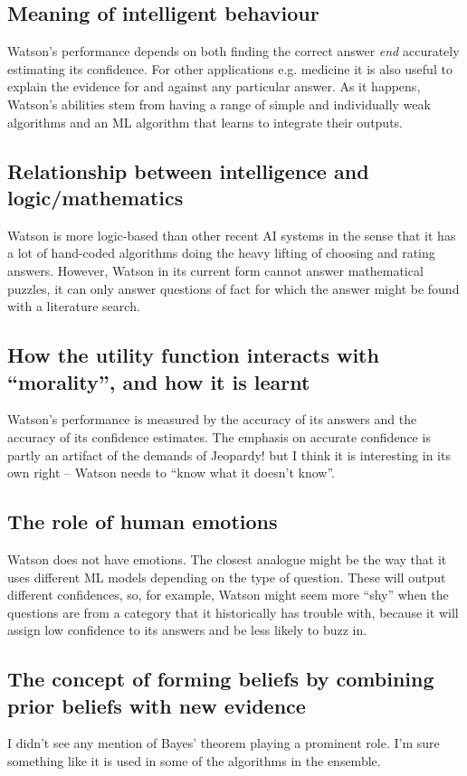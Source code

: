 \documentclass[10pt,a4paper]{article}
\newcommand{\nquote}[1]{``{#1}''}
\begin{document}
\subsection{Meaning of intelligent behaviour}
Watson's performance depends on both finding the correct answer \emph{end} accurately estimating its confidence. For other applications e.g. medicine \cite{watsonmedicine} it is also useful to explain the evidence for and against any particular answer. As it happens, Watson's abilities stem from having a range of simple and individually weak algorithms and an ML algorithm that learns to integrate their outputs.

\subsection{Relationship between intelligence and logic/mathematics}
Watson is more logic-based than other recent AI systems in the sense that it has a lot of hand-coded algorithms doing the heavy lifting of choosing and rating answers. However, Watson in its current form cannot answer mathematical puzzles, it can only answer questions of fact for which the answer might be found with a literature search.

\subsection{How the utility function interacts with \nquote{morality}, and how it is learnt}
Watson's performance is measured by the accuracy of its answers and the accuracy of its confidence estimates. The emphasis on accurate confidence is partly an artifact of the demands of Jeopardy! but I think it is interesting in its own right -- Watson needs to \nquote{know what it doesn't know}.

\subsection{The role of human emotions}
Watson does not have emotions. The closest analogue might be the way that it uses different ML models depending on the type of question. These will output different confidences, so, for example, Watson might seem more \nquote{shy} when the questions are from a category that it historically has trouble with, because it will assign low confidence to its answers and be less likely to buzz in.

\subsection{The concept of forming beliefs by combining prior beliefs with new evidence}
I didn't see any mention of Bayes' theorem playing a prominent role. I'm sure something like it is used in some of the algorithms in the ensemble.
\end{document}

